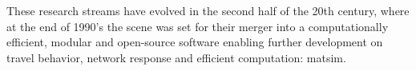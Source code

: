 


These research streams have evolved in the second half of the 20th century, where at the end of 1990’s the scene was set for their merger into a computationally efficient, modular and open-source software enabling further development on travel behavior, network response and efficient computation: \gls{matsim}.




%


